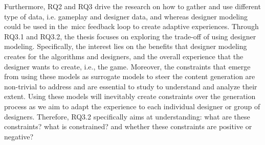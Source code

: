 Furthermore, RQ2 and RQ3 drive the research on how to gather and use different type of data, i.e. gameplay and designer data, and whereas designer modeling could be used in the~\acrshort{micc} feedback loop to create adaptive experiences. Through RQ3.1 and RQ3.2, the thesis focuses on exploring the trade-off of using designer modeling. Specifically, the interest lies on the benefits that designer modeling creates for the algorithms and designers, and the overall experience that the designer wants to create, i.e., the game. Moreover, the constraints that emerge from using these models as surrogate models to steer the content generation are non-trivial to address and are essential to study to understand and analyze their extent. Using these models will inevitably create constraints over the generation process as we aim to adapt the experience to each individual designer or group of designers. Therefore, RQ3.2 specifically aims at understanding: what are these constraints? what is constrained? and whether these constraints are positive or negative? 





